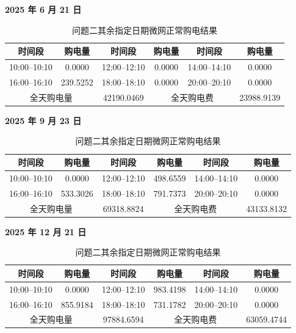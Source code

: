 \documentclass[12pt,a4paper]{ctexart}
\renewcommand{\textbf}[1]{{\CJKfamily{heiti}\bfseries #1}}
\begin{document}
\begin{table}[H]
\centering
\caption{问题二其余指定日期微网正常购电结果}
\label{tab:q2-purchase-appendix}
\small
\textbf{2025 年 6 月 21 日}\par
\begin{tabular}{|c|c|c|c|c|c|}
\hline
时间段 & 购电量 & 时间段 & 购电量 & 时间段 & 购电量\\
\hline
10:00--10:10 & 0.0000 & 12:00--12:10 & 0.0000 & 14:00--14:10 & 0.0000\\
\hline
16:00--16:10 & 239.5252 & 18:00--18:10 & 0.0000 & 20:00--20:10 & 0.0000\\
\hline
\multicolumn{2}{|c|}{全天购电量} & 42190.0469 & \multicolumn{2}{c|}{全天购电费} & 23988.9139\\
\hline
\end{tabular}\par\vspace{0.7em}

\textbf{2025 年 9 月 23 日}\par
\begin{tabular}{|c|c|c|c|c|c|}
\hline
时间段 & 购电量 & 时间段 & 购电量 & 时间段 & 购电量\\
\hline
10:00--10:10 & 0.0000 & 12:00--12:10 & 498.6559 & 14:00--14:10 & 0.0000\\
\hline
16:00--16:10 & 533.3026 & 18:00--18:10 & 791.7373 & 20:00--20:10 & 0.0000\\
\hline
\multicolumn{2}{|c|}{全天购电量} & 69318.8824 & \multicolumn{2}{c|}{全天购电费} & 43133.8132\\
\hline
\end{tabular}\par\vspace{0.7em}

\textbf{2025 年 12 月 21 日}\par
\begin{tabular}{|c|c|c|c|c|c|}
\hline
时间段 & 购电量 & 时间段 & 购电量 & 时间段 & 购电量\\
\hline
10:00--10:10 & 0.0000 & 12:00--12:10 & 983.4198 & 14:00--14:10 & 0.0000\\
\hline
16:00--16:10 & 855.9184 & 18:00--18:10 & 731.1782 & 20:00--20:10 & 0.0000\\
\hline
\multicolumn{2}{|c|}{全天购电量} & 97884.6594 & \multicolumn{2}{c|}{全天购电费} & 63059.4744\\
\hline
\end{tabular}
\end{table}
\end{document}
